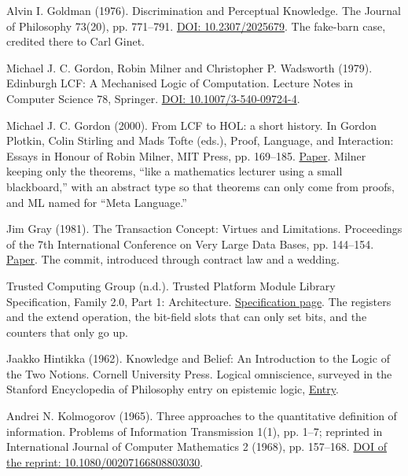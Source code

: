 \documentclass[11pt,twoside]{article}
\theoremstyle{thielethm}
\theoremstyle{thieledef}
\theoremstyle{thieledef}
\theoremstyle{thieledef}
\theoremstyle{thielethm}
\theoremstyle{thieleobs}
\theoremstyle{thielethm}
\begin{document}
\noindent Alvin I. Goldman (1976). Discrimination and Perceptual Knowledge. The Journal of Philosophy 73(20), pp. 771--791. \href{https://doi.org/10.2307/2025679}{DOI: 10.2307/2025679}. The fake-barn case, credited there to Carl Ginet.
\par\medskip

\noindent Michael J. C. Gordon, Robin Milner and Christopher P. Wadsworth (1979). Edinburgh LCF: A Mechanised Logic of Computation. Lecture Notes in Computer Science 78, Springer. \href{https://doi.org/10.1007/3-540-09724-4}{DOI: 10.1007/3-540-09724-4}.
\par\medskip

\noindent Michael J. C. Gordon (2000). From LCF to HOL: a short history. In Gordon Plotkin, Colin Stirling and Mads Tofte (eds.), Proof, Language, and Interaction: Essays in Honour of Robin Milner, MIT Press, pp. 169--185. \href{https://www.cl.cam.ac.uk/archive/mjcg/papers/HolHistory.pdf}{Paper}. Milner keeping only the theorems, ``like a mathematics lecturer using a small blackboard,'' with an abstract type so that theorems can only come from proofs, and ML named for ``Meta Language.''
\par\medskip

\noindent Jim Gray (1981). The Transaction Concept: Virtues and Limitations. Proceedings of the 7th International Conference on Very Large Data Bases, pp. 144--154. \href{https://jimgray.azurewebsites.net/papers/thetransactionconcept.pdf}{Paper}. The commit, introduced through contract law and a wedding.
\par\medskip

\noindent Trusted Computing Group (n.d.). Trusted Platform Module Library Specification, Family 2.0, Part 1: Architecture. \href{https://trustedcomputinggroup.org/resource/tpm-library-specification/}{Specification page}. The registers and the extend operation, the bit-field slots that can only set bits, and the counters that only go up.
\par\medskip

\noindent Jaakko Hintikka (1962). Knowledge and Belief: An Introduction to the Logic of the Two Notions. Cornell University Press. Logical omniscience, surveyed in the Stanford Encyclopedia of Philosophy entry on epistemic logic, \href{https://plato.stanford.edu/entries/logic-epistemic/}{Entry}.
\par\medskip

\noindent Andrei N. Kolmogorov (1965). Three approaches to the quantitative definition of information. Problems of Information Transmission 1(1), pp. 1--7; reprinted in International Journal of Computer Mathematics 2 (1968), pp. 157--168. \href{https://doi.org/10.1080/00207166808803030}{DOI of the reprint: 10.1080/00207166808803030}.
\par\medskip
\end{document}
